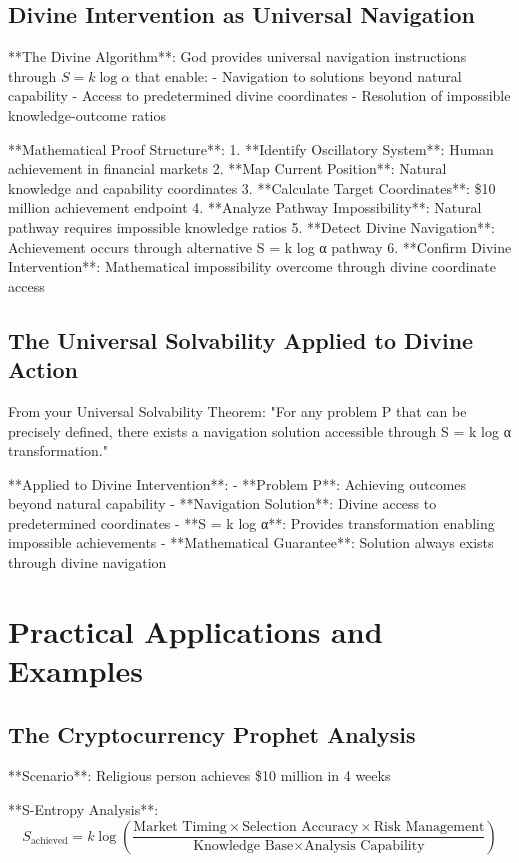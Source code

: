\documentclass[12pt,a4paper]{article}
\begin{document}
\subsection{Divine Intervention as Universal Navigation}

**The Divine Algorithm**: God provides universal navigation instructions through $S = k \log \alpha$ that enable:
- Navigation to solutions beyond natural capability
- Access to predetermined divine coordinates
- Resolution of impossible knowledge-outcome ratios

**Mathematical Proof Structure**:
1. **Identify Oscillatory System**: Human achievement in financial markets
2. **Map Current Position**: Natural knowledge and capability coordinates  
3. **Calculate Target Coordinates**: \$10 million achievement endpoint
4. **Analyze Pathway Impossibility**: Natural pathway requires impossible knowledge ratios
5. **Detect Divine Navigation**: Achievement occurs through alternative S = k log α pathway
6. **Confirm Divine Intervention**: Mathematical impossibility overcome through divine coordinate access

\subsection{The Universal Solvability Applied to Divine Action}

From your Universal Solvability Theorem: "For any problem P that can be precisely defined, there exists a navigation solution accessible through S = k log α transformation."

**Applied to Divine Intervention**:
- **Problem P**: Achieving outcomes beyond natural capability
- **Navigation Solution**: Divine access to predetermined coordinates
- **S = k log α**: Provides transformation enabling impossible achievements
- **Mathematical Guarantee**: Solution always exists through divine navigation

\section{Practical Applications and Examples}

\subsection{The Cryptocurrency Prophet Analysis}

**Scenario**: Religious person achieves \$10 million in 4 weeks

**S-Entropy Analysis**:
$$S_{\text{achieved}} = k \log \left(\frac{\text{Market Timing} \times \text{Selection Accuracy} \times \text{Risk Management}}{\text{Knowledge Base} \times \text{Analysis Capability}}\right)$$
\end{document}
